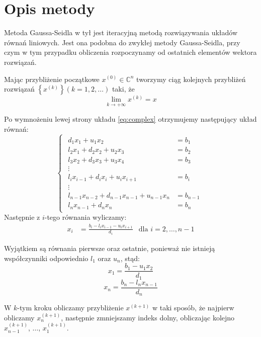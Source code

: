 \documentclass[12pt]{article}
\begin{document}
	
	\section{Opis metody}
	Metoda Gaussa-Seidla w tył jest iteracyjną metodą rozwiązywania układów równań liniowych. Jest ona podobna do zwykłej metody Gaussa-Seidla, przy czym w tym przypadku obliczenia rozpoczynamy od ostatnich elementów wektora rozwiązań.
	
	
	Mając przybliżenie początkowe $x^{(0)} \in \mathbb{C}^n$ tworzymy ciąg kolejnych przybliżeń rozwiązań $\left\{ x^{(k)} \right\} (k = 1, 2, \dots)$ taki, że
	$$\lim_{k \to +\infty} x^{(k)} = x$$
	
	Po wymnożeniu lewej strony układu \eqref{eq:complex} otrzymujemy następujący układ równań:
	\[
	\begin{cases}
		\begin{aligned}
			d_1 x_1 + u_1 x_2                               & = b_1     \\
			l_2 x_1 + d_2 x_2 + u_2 x_3                     & = b_2     \\
			l_3 x_2 + d_3 x_3 + u_3 x_4                     & = b_3     \\
			\vdots    \hspace{1em}                          &  \\
			l_i x_{i-1} + d_i x_i + u_i x_{i+1}             & = b_i     \\
			\vdots        \hspace{1em}                      &  \\
			l_{n-1} x_{n-2} + d_{n-1} x_{n-1} + u_{n-1} x_n & = b_{n-1} \\
			l_n x_{n-1} + d_n x_n                           & = b_n
		\end{aligned}
	\end{cases}
	\]
	Następnie z $i$-tego równania wyliczamy:
	\begin{align*}
		x_i & = \frac{b_i - l_i x_{i-1} - u_i x_{i+1}}{d_i} & \text{dla } i = 2, \dots, n-1
	\end{align*}
	
	Wyjątkiem są równania pierwsze oraz ostatnie, ponieważ nie istnieją współczynniki odpowiednio $l_1$ oraz $u_n$, stąd:
	$$
	x_1 = \frac{b_1 - u_1 x_2}{d_1}
	$$
	$$
	x_n = \frac{b_n - l_n x_{n-1}}{d_n}
	$$
	
	W $k$-tym kroku obliczamy przybliżenie $x^{(k+1)}$ w taki sposób, że najpierw obliczamy $x^{(k+1)}_n$, następnie zmniejszamy indeks dolny, obliczając kolejno $x^{(k+1)}_{n-1}$, $\dots$, $x^{(k+1)}_1$.
	
\end{document}
